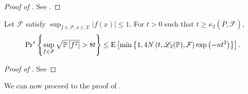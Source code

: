 \begin{proof}[Proof of ]
See .
\end{proof}

\begin{lemma}
\label{lem--sqrt-ep-2nd-moment-sup-pbound}
Let \(\mathcal{F}\) satisfy \(\sup_{f \in \mathcal{F}, x \in \mathcal{X}} |f
(x)| \leq 1\).
For \(t > 0\) such that \(t \geq \kappa_{2} \left( \overline{P}, \mathcal{F}
\right)\),
\begin{equation}
  \mathrm{Pr}^{\ast} \left\{ \sup_{f \in \mathcal{F}} \sqrt{\mathbb{P} \left[ f^{2}
  \right]} > 8 t \right\} \leq \mathrm{E} \left[\min \left\{ 1, 4 N \left( t,
  \mathscr{L}_{2} (\mathbb{P}), \mathcal{F} \right) \exp \left( - n t^{2}
  \right) \right\} \right].
  \label{eqn--sqrt-ep-2nd-moment-sup-pbound}
\end{equation}
\end{lemma}

\begin{proof}[Proof of ]
See
\end{proof}

We can now proceed to the proof of .

